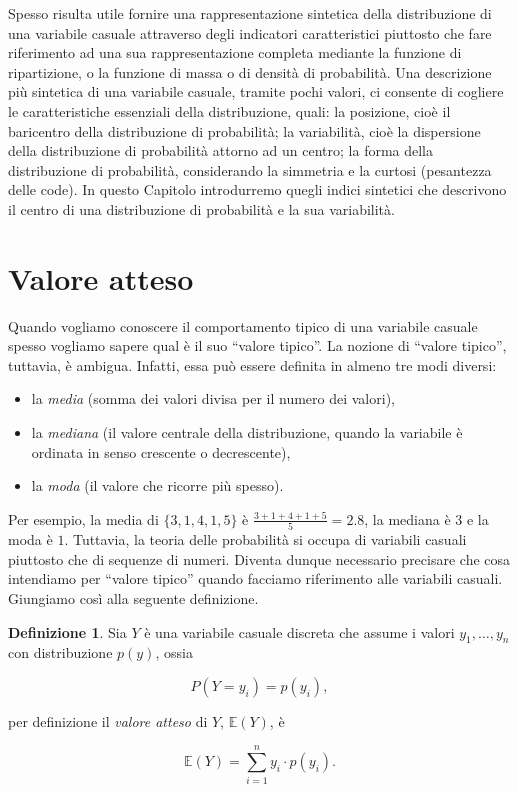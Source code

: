 \documentclass[
  11pt,
]{krantz}
\providecommand{\tightlist}{%
  \setlength{\itemsep}{0pt}\setlength{\parskip}{0pt}}
\newcommand{\E}{\mathbb{E}} %
\theoremstyle{definition}
\newtheorem{definition}{Definizione}[chapter]
\theoremstyle{definition}
\theoremstyle{definition}
\theoremstyle{definition}
\theoremstyle{remark}
\begin{document}
Spesso risulta utile fornire una rappresentazione sintetica della distribuzione di una variabile casuale attraverso degli indicatori caratteristici piuttosto che fare riferimento ad una sua rappresentazione completa mediante la funzione di ripartizione, o la funzione di massa o di densità di probabilità. Una descrizione più sintetica di una variabile casuale, tramite pochi valori, ci consente di cogliere le caratteristiche essenziali della distribuzione, quali: la posizione, cioè il baricentro della distribuzione di probabilità; la variabilità, cioè la dispersione della distribuzione di probabilità attorno ad un centro; la forma della distribuzione di probabilità, considerando la simmetria e la curtosi (pesantezza delle code). In questo Capitolo introdurremo quegli indici sintetici che descrivono il centro di una distribuzione di probabilità e la sua variabilità.

\hypertarget{valore-atteso}{%
\section{Valore atteso}\label{valore-atteso}}

Quando vogliamo conoscere il comportamento tipico di una variabile casuale spesso vogliamo sapere qual è il suo ``valore tipico''. La nozione di ``valore tipico'', tuttavia, è ambigua. Infatti, essa può essere definita in almeno tre modi diversi:

\begin{itemize}
\tightlist
\item
  la \emph{media} (somma dei valori divisa per il numero dei valori),
\item
  la \emph{mediana} (il valore centrale della distribuzione, quando la variabile è ordinata in senso crescente o decrescente),
\item
  la \emph{moda} (il valore che ricorre più spesso).
\end{itemize}

Per esempio, la media di \(\{3, 1, 4, 1, 5\}\) è \(\frac{3+1+4+1+5}{5} = 2.8\), la mediana è \(3\) e la moda è \(1\). Tuttavia, la teoria delle probabilità si occupa di variabili casuali piuttosto che di sequenze di numeri. Diventa dunque necessario precisare che cosa intendiamo per ``valore tipico'' quando facciamo riferimento alle variabili casuali. Giungiamo così alla seguente definizione.

\begin{definition}
Sia \(Y\) è una variabile casuale discreta che assume i valori \(y_1, \dots, y_n\) con distribuzione \(p(y)\), ossia

\[
P(Y = y_i) = p(y_i),
\]

per definizione il \emph{valore atteso} di \(Y\), \(\E(Y)\), è

\begin{equation}
\E(Y) = \sum_{i=1}^n y_i \cdot p(y_i).
\label{eq:expval-discr}
\end{equation}
\end{definition}
\end{document}
